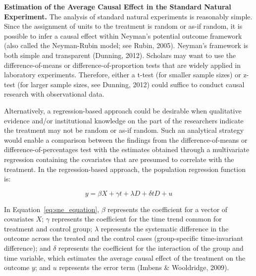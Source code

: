 \documentclass[english]{article}
\begin{document}
\noindent \textbf{Estimation of the Average Causal Effect in the Standard Natural
Experiment.} The analysis of standard natural experiments is reasonably simple. Since
the assignment of units to the treatment is random or as-if random, it
is possible to infer a causal effect within Neyman's potential outcome
framework (also called the Neyman-Rubin model; see Rubin, 2005).
Neyman's framework is both simple and transparent (Dunning, 2012).
Scholars may want to use the difference-of-means or
difference-of-proportion tests that are widely applied in laboratory
experiments. Therefore, either a t-test (for smaller sample sizes) or
z-test (for larger sample sizes, see Dunning, 2012) could suffice to
conduct causal research with observational data.

Alternatively, a regression-based approach could be desirable when
qualitative evidence and/or institutional knowledge on the part of the
researchers indicate the treatment may not be random or as-if random.
Such an analytical strategy would enable a comparison between the
findings from the difference-of-means or difference-of-percentages test
with the estimates obtained through a multivariate regression containing
the covariates that are presumed to correlate with the treatment. In the
regression-based approach, the population regression function is:

\begin{equation}\label{eq:sne_equation}
	y = \beta X + \gamma t + \lambda D + \delta t D + u
\end{equation}

In Equation~\ref{eq:sne_equation}, $\beta$ represents the coefficient for a
vector of covariates $X$; $\gamma$ represents the coefficient for the time
trend common for treatment and control group; $\lambda$ represents the
systematic difference in the outcome across the treated and the control cases
(group-specific time-invariant difference); and $\delta$ represents the
coefficient for the interaction of the group and time variable, which estimates
the average causal effect of the treatment on the outcome $y$; and $u$
represents the error term (Imbens \& Wooldridge, 2009).
\end{document}

